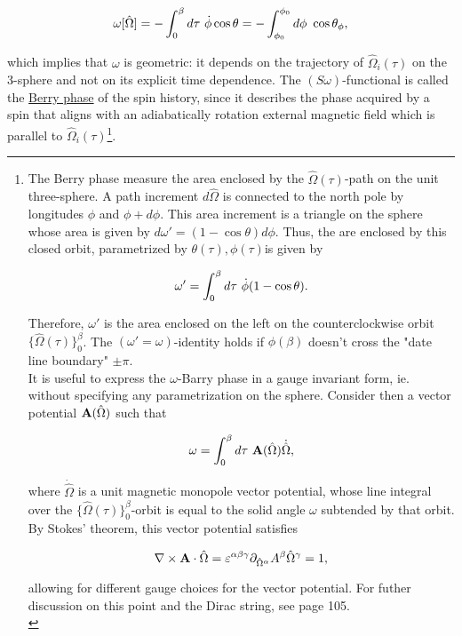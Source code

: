 \begin{equation}
    \omega[\hat{\Omega}] = -\int_{0}^\beta d\tau \textnormal{ } \dot{\phi} \cos \theta = - \int_{\phi_0}^{\phi_0} d\phi \textnormal{ } \cos \theta_\phi,
\end{equation}

which implies that $\omega$ is geometric: it depends on the trajectory of $\hat{\Omega}_i(\tau)$ on the 3-sphere and not on its explicit time dependence. The $(S\omega)$-functional is called the \underline{Berry phase} of the spin history, since it describes the phase acquired by a spin that aligns with an adiabatically rotation external magnetic field which is parallel to $\hat{\Omega}_i(\tau)$\footnote{

The Berry phase measure the area enclosed by the $\hat{\Omega}(\tau)$-path on the unit three-sphere. A path increment $d\hat{\Omega}$ is connected to the north pole by longitudes $\phi$ and $\phi + d\phi$. This area increment is a triangle on the sphere whose area is given by $d\omega' = (1-\cos \theta) d\phi$. Thus, the are enclosed by this closed orbit, parametrized by $\theta(\tau), \phi(\tau)$is given by 

$$
    \omega' = \int_0^\beta d\tau \textnormal{ } \dot{\phi}(1-\cos \theta).
$$

Therefore, $\omega'$ is the area enclosed on the left on the counterclockwise orbit $\{\hat{\Omega}(\tau)\}_0^\beta$. The $(\omega' = \omega)$-identity holds if $\phi(\beta)$ doesn't cross the "date line boundary" $\pm \pi$. \\

It is useful to express the $\omega$-Barry phase in a gauge invariant form, ie. without specifying any parametrization on the sphere. Consider then a vector potential ${\bf A}(\hat{\Omega})$ such that 

$$
    \omega = \int_{0}^{\beta} d\tau \textnormal{ } {\bf A}(\hat{\Omega}) \dot{\hat{\Omega}},
$$

where $\dot{\hat{\Omega}}$ is a unit magnetic monopole vector potential, whose line integral over the $\{\hat{\Omega}(\tau)\}_0^\beta$-orbit is equal to the solid angle $\omega$ subtended by that orbit. By Stokes' theorem, this vector potential satisfies 

\begin{equation}
    \nabla \times {\bf A} \cdot \hat{\Omega} = \varepsilon^{\alpha\beta\gamma} \partial_{{\hat{\Omega}^\alpha}} A^\beta \hat{\Omega}^\gamma = 1,
\end{equation}

allowing for different gauge choices for the vector potential. For futher discussion on this point and the Dirac string, see \cite{assa} page 105. \\

}. \\

